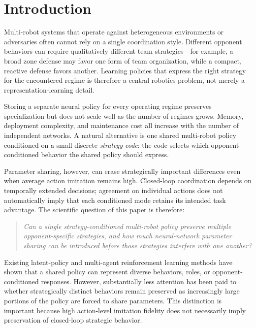\section{Introduction}

Multi-robot systems that operate against heterogeneous environments or
adversaries often cannot rely on a single coordination style. Different opponent
behaviors can require qualitatively different team strategies---for example, a
broad zone defense may favor one form of team organization, while a compact,
reactive defense favors another. Learning policies that express the right
strategy for the encountered regime is therefore a central robotics problem,
not merely a representation-learning detail.

Storing a separate neural policy for every operating regime preserves
specialization but does not scale well as the number of regimes grows. Memory,
deployment complexity, and maintenance cost all increase with the number of
independent networks. A natural alternative is one shared multi-robot policy
conditioned on a small discrete \emph{strategy code}: the code selects which
opponent-conditioned behavior the shared policy should express.

Parameter sharing, however, can erase strategically important differences even
when average action imitation remains high. Closed-loop coordination depends on
temporally extended decisions; agreement on individual actions does not
automatically imply that each conditioned mode retains its intended task
advantage. The scientific question of this paper is therefore:

\begin{quote}
\emph{Can a single strategy-conditioned multi-robot policy preserve multiple
opponent-specific strategies, and how much neural-network parameter sharing can
be introduced before those strategies interfere with one another?}
\end{quote}

Existing latent-policy and multi-agent reinforcement learning methods have shown
that a shared policy can represent diverse behaviors, roles, or
opponent-conditioned responses. However, substantially less attention has been
paid to whether strategically distinct behaviors remain preserved as
increasingly large portions of the policy are forced to share parameters. This
distinction is important because high action-level imitation fidelity does not
necessarily imply preservation of closed-loop strategic behavior.

